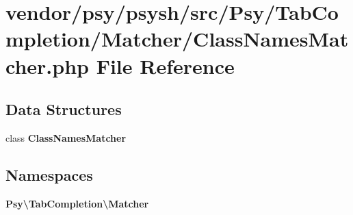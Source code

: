\section{vendor/psy/psysh/src/\+Psy/\+Tab\+Completion/\+Matcher/\+Class\+Names\+Matcher.php File Reference}
\label{_class_names_matcher_8php}
\subsection*{Data Structures}
\begin{DoxyCompactItemize}
\item 
class {\bf Class\+Names\+Matcher}
\end{DoxyCompactItemize}
\subsection*{Namespaces}
\begin{DoxyCompactItemize}
\item 
 {\bf Psy\textbackslash{}\+Tab\+Completion\textbackslash{}\+Matcher}
\end{DoxyCompactItemize}

